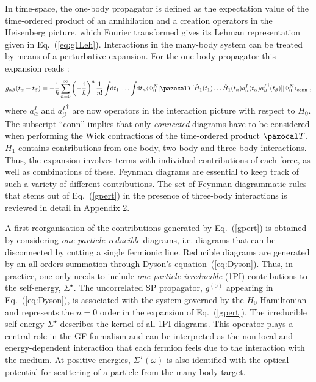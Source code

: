 In time-space, the one-body propagator is defined as the expectation value of the time-ordered product of an annihilation and a creation operators in the Heisenberg picture, which Fourier transformed gives its Lehman representation given in Eq.~(\ref{eq:g1Leh}). Interactions in the many-body system can be treated by means of a perturbative expansion. 
For the one-body propagator this expansion reads \cite{Mattuck1992,Dickhoff2008}:
\begin{equation}
\label{gpert}
g_{\alpha\beta}(t_\alpha-t_\beta) = -\frac{\rm i}{\hbar} \sum_{n=0}^\infty \left(-\frac{\rm i}{\hbar}\right)^n\frac{1}{n!}\int \hspace{-1mm} {\rm d} t_1 \; \ldots \int \hspace{-1mm} {\rm d} t_n \langle\Phi_0^N\vert {\pazocal T} [\hat H_1(t_1) \ldots \hat H_1(t_n)a^I_\alpha(t_\alpha){a_{\beta}^I}^\dag(t_\beta)]\vert\Phi_0^N\rangle_\text{conn} \; ,
\end{equation}
where $a^I_\alpha$ and ${a_{\beta}^I}^\dag$ are now operators in the interaction picture with respect to $H_0$. 
The subscript ``conn'' implies that only \emph{connected} diagrams have to be considered when performing
the Wick contractions of the time-ordered product ${\pazocal T}$. $H_1$ contains contributions from one-body, two-body and three-body interactions. Thus, the expansion involves terms with individual contributions of each force, as well as combinations of these. 
Feynman diagrams are essential to keep track of such a variety of different contributions.
The set of Feynman diagrammatic rules that stems out of Eq.~(\ref{gpert}) in the presence of three-body interactions
is reviewed in detail in Appendix 2.

A first reorganisation of the contributions generated by Eq.~(\ref{gpert}) is obtained by considering 
\emph{one-particle reducible} diagrams, i.e. diagrams that can be disconnected by cutting a single fermionic line. 
Reducible diagrams are generated by an all-orders summation through Dyson's equation~(\ref{eq:Dyson}). Thus, in practice, one only needs to include \emph{one-particle irreducible} (1PI) contributions
to the self-energy, $\Sigma^\star$. 
The uncorrelated SP propagator, $g^{(0)}$ appearing in Eq.~(\ref{eq:Dyson}), is associated with the system governed by the $H_0$ Hamiltonian 
and represents the $n=0$ order in the expansion of Eq.~(\ref{gpert}). The irreducible self-energy $\Sigma^\star$ describes the kernel of all 1PI diagrams.
This operator plays a central role in the GF formalism and can be interpreted as the 
non-local and energy-dependent interaction that each fermion feels due to the interaction with the medium. 
At positive energies, $\Sigma^\star(\omega)$ is also identified with the optical potential for scattering of a particle 
from the many-body target. 

